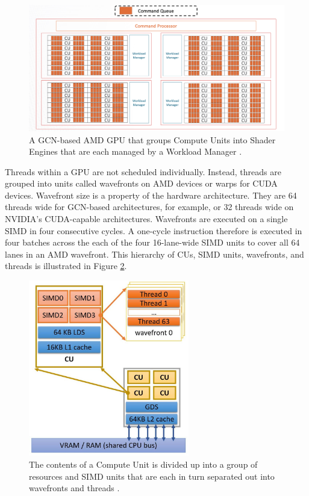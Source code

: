 \begin{figure}[hbtp]
\includegraphics[width=\textwidth]{figures/gcn2.png}
\centering
\caption{A GCN-based AMD GPU that groups Compute Units into Shader Engines that are each managed by a Workload Manager \cite{amdConferenceTalk}.}
\label{gcn2}
\end{figure}

\quad Threads within a GPU are not scheduled individually. Instead, threads are grouped into units called wavefronts on AMD devices or warps for CUDA devices. Wavefront size is a property of the hardware architecture. They are 64 threads wide for GCN-based architectures, for example, or 32 threads wide on NVIDIA's CUDA-capable architectures. Wavefronts are executed on a single SIMD in four consecutive cycles. A one-cycle instruction therefore is executed in four batches across the each of the four 16-lane-wide SIMD units to cover all 64 lanes in an AMD wavefront. This hierarchy of CUs, SIMD units, wavefronts, and threads is illustrated in Figure \ref{gcn1}. 

\begin{figure}[hbtp]
\includegraphics[width=70mm,scale=0.5]{figures/gcn1.png}
\centering
\caption{The contents of a Compute Unit is divided up into a group of resources and SIMD units that are each in turn separated out into wavefronts and threads \cite{gpuSortPerformance}.}
\label{gcn1}
\end{figure}


